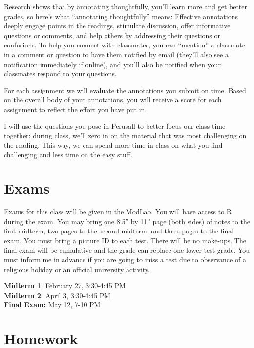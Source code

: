 \documentclass[12pt]{article}
\begin{document}
Research shows that by annotating thoughtfully, you'll learn more and get better grades, so here's what ``annotating thoughtfully'' means: Effective annotations deeply engage points in the readings, stimulate discussion, offer informative questions or comments, and help others by addressing their questions or confusions. To help you connect with classmates, you can ``mention'' a classmate in a comment or question to have them notified by email (they'll also see a notification immediately if online), and you'll also be notified when your classmates respond to your questions. 

For each assignment we will evaluate the annotations you submit on time. Based on the overall body of your annotations, you will receive a score for each assignment to reflect the effort you have put in.

I will use the questions you pose in Perusall to better focus our class time together: during class, we'll zero in on the material that was most challenging on the reading.  This way, we can spend more time in class on what you find challenging and less time on the easy stuff.

\section*{Exams}

Exams for this class will be given in the ModLab.  You will have access to R during the exam.  You may bring one 8.5'' by 11'' page (both sides) of notes to the first midterm, two pages to the second midterm, and three pages to the final exam.  You must bring a picture ID to each test.  There will be no make-ups.  The final exam will be cumulative and the grade can replace one lower test grade.  You must inform me in advance if you are going to miss a test due to observance of a religious holiday or an official university activity.

\textbf{Midterm 1:} February 27, 3:30-4:45 PM  \\
\textbf{Midterm 2:} April 3, 3:30-4:45 PM  \\
\textbf{Final Exam:} May 12, 7-10 PM \\

\section*{Homework}
\end{document}
